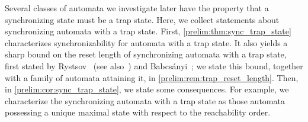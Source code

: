 
Several classes of automata we investigate later have the property that a
synchronizing state must be a trap state. Here, we collect statements about
synchronizing automata with a trap state.
First, \cref{prelim:thm:sync_trap_state} characterizes synchronizability for
automata with a trap state. It also yields a sharp bound on the reset length of
synchronizing automata with a trap state, first stated by Rystsov~\cite{Rys77}
(see also~\cite[Thm.~6.1]{Rystsov97}) and
Babcs{\'{a}}nyi~\cite[Cor.~3]{DBLP:conf/birthday/Babcsanyi09}; we state this
bound, together with a family of automata attaining it, in
\cref{prelim:rem:trap_reset_length}.
Then, in \cref{prelim:cor:sync_trap_state}, we state some consequences. For
example, we characterize the synchronizing automata with a trap state as those
automata possessing a unique maximal state with respect to the reachability order.


